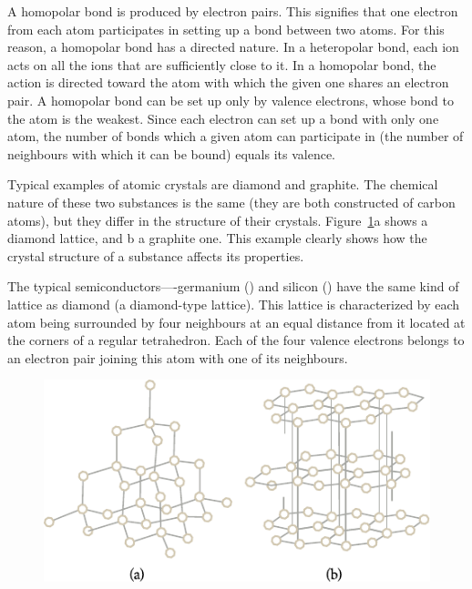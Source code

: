 A homopolar bond is produced by electron pairs. This signifies that one electron from each atom participates in setting up a bond between two atoms. For this reason, a homopolar bond has a directed nature. In a heteropolar bond, each ion acts on all the ions that are sufficiently close to it. In a homopolar bond, the action is directed toward the atom with which the given one shares an electron pair. A homopolar bond can be set up only by valence electrons, whose bond to the atom is the weakest. Since each electron can set up a bond with only one atom, the number of bonds which a given atom can participate in (the number of neighbours with which it can be bound) equals its valence.

Typical examples of atomic crystals are diamond and graphite. The chemical nature of these two substances is the same (they are both constructed of carbon atoms), but they differ in the structure of their crystals. Figure~\ref{fig:13_6}a shows a diamond lattice, and b a graphite one. This example clearly shows how the crystal structure of a substance affects its properties.

The typical semiconductors----germanium () and silicon () have the same kind of lattice as diamond (a diamond-type lattice). This lattice is characterized by each atom being surrounded by four neighbours at an equal distance from it located at the corners of a regular tetrahedron. Each of the four valence electrons belongs to an electron pair joining this atom with one of its neighbours.

\begin{figure}[t]
	\begin{center}
		\includegraphics[scale=1.0]{figures/ch_13/fig_13_6.pdf}
		\caption[]{}
		\label{fig:13_6}
	\end{center}
	\vspace{-0.4cm}
\end{figure}


